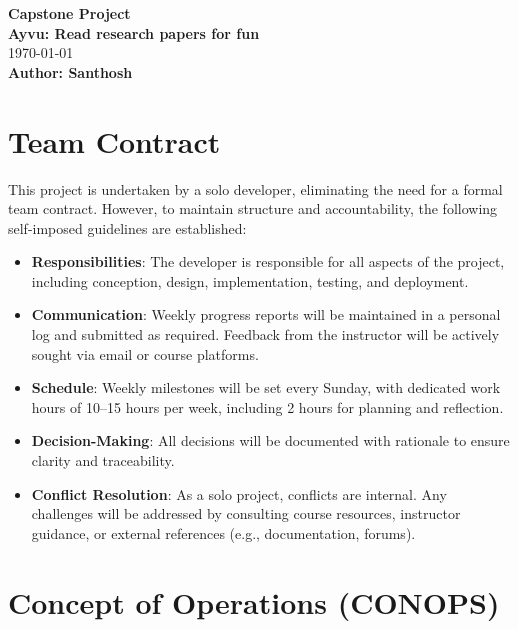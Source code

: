 \documentclass[12pt]{article}
\begin{document}
\begin{titlepage}
  \centering
  \vspace*{1cm}
  \textbf{\Large Capstone Project} \\
  \vspace{0.5cm}
  \textbf{Ayvu: Read research papers for fun} \\
  \vspace{1cm}
  \today \\
  \vspace{1cm}
  \textbf{Author: Santhosh} \\
  \vfill
\end{titlepage}

\tableofcontents
\newpage

\section{Team Contract}
This project is undertaken by a solo developer, eliminating the need for a formal team contract. However, to maintain structure and accountability, the following self-imposed guidelines are established:

\begin{itemize}
  \item \textbf{Responsibilities}: The developer is responsible for all aspects of the project, including conception, design, implementation, testing, and deployment.
  \item \textbf{Communication}: Weekly progress reports will be maintained in a personal log and submitted as required. Feedback from the instructor will be actively sought via email or course platforms.
  \item \textbf{Schedule}: Weekly milestones will be set every Sunday, with dedicated work hours of 10–15 hours per week, including 2 hours for planning and reflection.
  \item \textbf{Decision-Making}: All decisions will be documented with rationale to ensure clarity and traceability.
  \item \textbf{Conflict Resolution}: As a solo project, conflicts are internal. Any challenges will be addressed by consulting course resources, instructor guidance, or external references (e.g., documentation, forums).
\end{itemize}

\section{Concept of Operations (CONOPS)}
\end{document}
